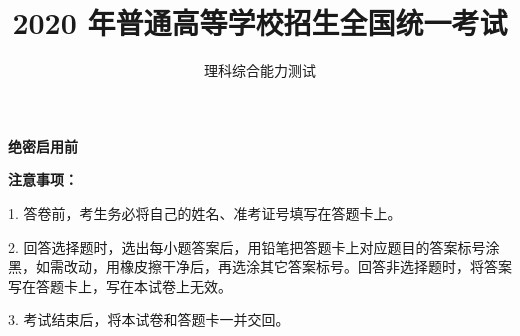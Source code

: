 \documentclass[list,mac]{BHCexam}
\begin{document}
\textbf{绝密启用前} 
\title{2020 年普通高等学校招生全国统一考试}
\subtitle{理科综合能力测试}
\maketitle

\textbf{注意事项：} 
\setlength\parindent{2em}

1. 答卷前，考生务必将自己的姓名、准考证号填写在答题卡上。

2. 回答选择题时，选出每小题答案后，用铅笔把答题卡上对应题目的答案标号涂黑，如需改动，用橡皮擦干净后，再选涂其它答案标号。回答非选择题时，将答案写在答题卡上，写在本试卷上无效。

3. 考试结束后，将本试卷和答题卡一并交回。

\begin{groups}


\begin{questions}[30s]

\end{questions}


\begin{questions}[p]

\end{questions}



\end{groups}
\label{lastpage}
\end{document}
